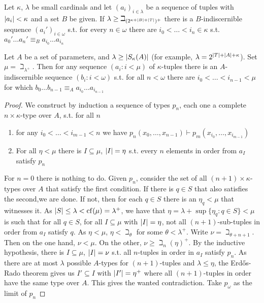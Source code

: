 \documentclass[11pt]{article}
\begin{document}
\begin{proposition}[]
\label{C2.4.8}
Let \(\kappa\), \(\lambda\) be small cardinals and let \((a_i)_{i\in\lambda}\) be a sequence of tuples with \(\abs{a_i}<\kappa\)
and a set \(B\) be given. If \(\lambda\ge\beth_{(2^{\kappa+\abs{B}+\abs{T}})^+}\) there is a \(B\)-indiscernible
sequence \((a_i')_{i\in\omega}\) s.t. for every \(n\in\omega\) there are \(i_0<\dots<i_n\in\kappa\)
s.t. \(a_0'\dots a_n'\equiv_Ba_{i_0}\dots a_{i_n}\)

Let \(A\) be a set of parameters, and \(\lambda\ge\abs{S_\kappa(A)}\) (for
example, \(\lambda=2^{\abs{T}+\abs{A}+\kappa}\)). Set \(\mu=\beth_{\lambda^+}\). Then for any sequence \((a_i:i<\mu)\) of
\(\kappa\)-tuples there is an \(A\)-indiscernible sequence \((b_i:i<\omega)\) s.t. for all \(n<\omega\) there
are \(i_0<\dots<i_{n-1}<\mu\) for which \(b_0\dots b_{n-1}\equiv_Aa_{i_0}\dots a_{i_{n-1}}\)
\end{proposition}

\begin{proof}
We construct by induction a sequence of types \(p_n\), each one a complete \(n\times\kappa\)-type over \(A\),
s.t. for all \(n\)
\begin{enumerate}
\item for any \(i_0<\dots<i_{m-1}<n\) we have \(p_n(x_0,\dots,x_{n-1})\vdash p_m(x_{i_0},\dots,x_{i_{m-1}})\)
\item For all \(\eta<\mu\) there is \(I\subseteq\mu\), \(\abs{I}=\eta\) s.t. every \(n\) elements in order
from \(a_I\) satisfy \(p_n\)
\end{enumerate}


For \(n=0\) there is nothing to do. Given \(p_n\), consider the set of all \((n+1)\times\kappa\)-types
over \(A\) that satisfy the first condition. If there is \(q\in S\) that also satisfies the
second,we are done. If not, then for each \(q\in S\) there is an \(\eta_q<\mu\) that witnesses it.
As \(\abs{S}\le\lambda<\cf(\mu)=\lambda^+\), we have that \(\eta=\lambda+\sup\{\eta_q:q\in S\}<\mu\) is such that for all \(q\in S\),
for all \(I\subseteq\mu\) with \(\abs{I}=\eta\), not all \((n+1)\)-sub-tuples in order from \(a_I\)
satisfy \(q\). As \(\eta<\mu\), \(\eta<\beth_\theta\) for some \(\theta<\lambda^+\). \label{Problem7} Write \(\nu=\beth_{\theta+n+1}\). Then on the one
hand, \(\nu<\mu\). On the other, \(\nu\ge\beth_n(\eta)^+\). By the inductive hypothesis, there
is \(I\subseteq\mu\), \(\abs{I}=\nu\) s.t. all \(n\)-tuples in order in \(a_I\) satisfy \(p_n\). As there
are at most \(\lambda\) possible \(A\)-types for \((n+1)\)-tuples and \(\lambda\le\eta\), the Erdős-Rado theorem gives
us \(I'\subseteq I\) with \(\abs{I'}=\eta^+\) where all \((n+1)\)-tuples in order have the same type
over \(A\). This gives the wanted contradiction. Take \(p_\omega\) as the limit of \(p_n\)
\end{proof}
\end{document}
